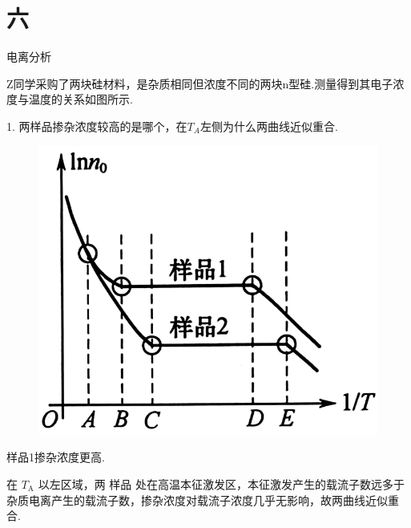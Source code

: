 \documentclass{beamer}
\begin{document}
\section{六}
\begin{frame}[t]{电离分析}

    {
    \kaishu
    \qquad Z同学采购了两块硅材料，是杂质相同但浓度不同的两块n型硅.测量得到其电子浓度与温度的关系如图所示.\par
    1. 两样品掺杂浓度较高的是哪个，在$T_A$左侧为什么两曲线近似重合.
    } \par
    
    \vspace{0.1cm}
    \begin{figure} %
    \vspace{-0.7cm}
	\begin{center}
		\includegraphics[width=0.93\linewidth]{8.png}
	\end{center}
    \end{figure}
    
    \qquad 样品1掺杂浓度更高. \par
    
    \qquad 在 $ T_\text{A} $ 以左区域，两 样品 处在高温本征激发区，本征激发产生的载流子数远多于杂质电离产生的载流子数，掺杂浓度对载流子浓度几乎无影响，故两曲线近似重合.
    
\end{frame}
\end{document}
